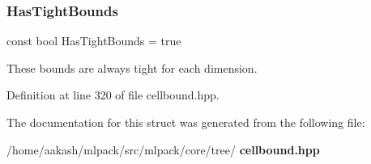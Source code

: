 \subsubsection{Has\+Tight\+Bounds}
{\footnotesize\ttfamily const bool Has\+Tight\+Bounds = true\hspace{0.3cm}{\ttfamily [static]}}



These bounds are always tight for each dimension. 



Definition at line 320 of file cellbound.\+hpp.



The documentation for this struct was generated from the following file\+:\begin{DoxyCompactItemize}
\item 
/home/aakash/mlpack/src/mlpack/core/tree/\textbf{ cellbound.\+hpp}\end{DoxyCompactItemize}
